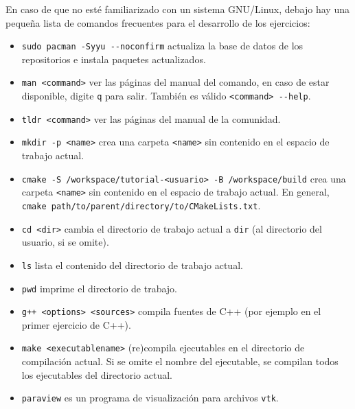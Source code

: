 \documentclass[9pt,a3paper]{scrartcl}
\begin{document}
En caso de que no esté familiarizado con un sistema GNU/Linux, debajo
hay una pequeña lista de comandos frecuentes para el desarrollo de
los ejercicios:
\begin{itemize}
	\item
	      \verb!sudo pacman -Syyu --noconfirm! actualiza la base de
	      datos de los repositorios e instala paquetes actualizados.

	\item
	      \verb!man <command>! ver las páginas del manual del comando,
	      en caso de estar disponible, digite \verb!q! para salir.
	      También es válido \verb!<command> --help!.

	\item
	      \verb!tldr <command>! ver las páginas del manual de la
	      comunidad.

	\item
	      \verb!mkdir -p <name>! crea una carpeta \verb!<name>! sin
	      contenido en el espacio de trabajo actual.

	\item
	      \verb!cmake -S /workspace/tutorial-<usuario> -B /workspace/build! crea una carpeta
	      \verb!<name>! sin contenido en el espacio de trabajo actual.
	      En general, \verb!cmake path/to/parent/directory/to/CMakeLists.txt!.

	\item
	      \verb!cd <dir>! cambia el directorio de trabajo actual
	      a \verb!dir! (al directorio del usuario, si se omite).

	\item
	      \verb!ls! lista el contenido del directorio de trabajo actual.

	\item
	      \verb!pwd! imprime el directorio de trabajo.

	\item
	      \verb!g++ <options> <sources>! compila fuentes de C++ (por ejemplo en el primer ejercicio de C++).

	\item
	      \verb!make <executablename>! (re)compila ejecutables en el
	      directorio de compilación actual.
	      Si se omite el nombre del ejecutable, se compilan todos los
	      ejecutables del directorio actual.

	\item
	      \verb!paraview! es un programa de visualización para archivos
	      \verb!vtk!.
\end{itemize}
\end{document}
